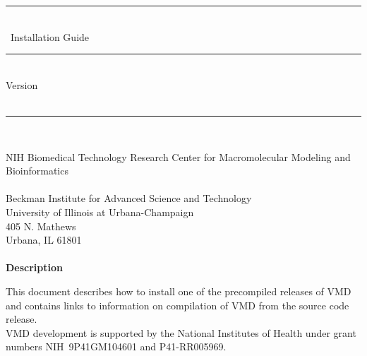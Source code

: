 \documentclass[11pt]{article}
\newcommand{\DOCTITLE} {Installation Guide}
\newcommand{\DOCDESC} {
This document describes how to install one of the precompiled releases
of VMD and contains links to information on compilation of VMD from the
source code release.}
\begin{document}
\thispagestyle{empty}

\vspace*{0.3in}

\begin{center}
  \rule{6in}{0.04in}                            \\      \vspace{0.25in}
  {\Huge \VMD\ \DOCTITLE}                       \\      \vspace{0.25in}
  \rule{6in}{0.04in}                            \\      \vspace{0.25in}
  {\Large Version \VMDVER}                      \\      \vspace{0.20in}
  \VMDDATE                                      \\      \vspace{0.20in}
  \rule{6in}{0.04in}                            \\      \vspace{0.25in}


  {\Large NIH Biomedical Technology Research Center for Macromolecular Modeling and Bioinformatics}  \\      \vspace{0.20in}
  {\large       {}  \\
                Beckman Institute for Advanced Science and Technology \\
                University of Illinois at Urbana-Champaign            \\
                405 N. Mathews                                        \\
                Urbana, IL  61801                                     \\
                \vspace{0.1in}  \\
  }
  \vspace{0.5in}
  {\Large \bf Description}
  \vspace{0.1in}
\end{center}

{\DOCDESC}
\vspace{0.1in} \\
VMD development is supported by the National Institutes of Health
under grant numbers NIH~9P41GM104601 and P41-RR005969.
\end{document}
